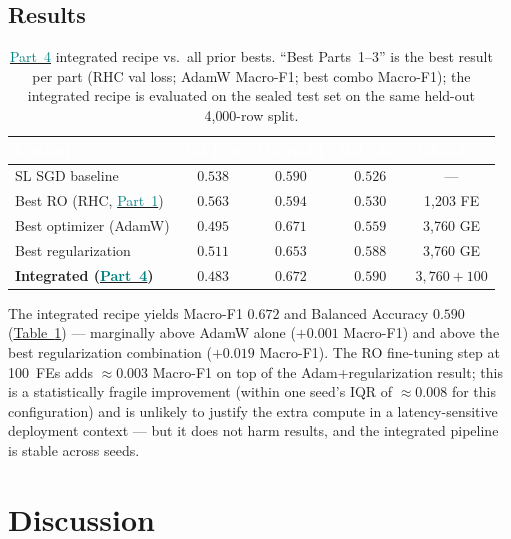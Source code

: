 \documentclass[conference]{IEEEtran}
\newcommand{\tabref}[1]{\hyperref[#1]{\textcolor{sage}{Table~\ref*{#1}}}}
\newcommand{\partref}[2]{\hyperref[#2]{\textcolor{teal}{Part~#1}}}
\begin{document}
\subsection{Results}\label{sec:p4:results}

\begin{table}[t]\centering
\caption{\partref{4}{sec:p4} integrated recipe vs.\ all prior bests.
``Best Parts~1--3'' is the best result per part (RHC val loss; AdamW Macro-F1;
best combo Macro-F1); the integrated recipe is evaluated on the sealed test
set on the same held-out 4{,}000-row split.}
\label{tab:p4}
\centering\small
{}
\begin{tabularx}{\linewidth}{Xcccc}
\toprule
\rowcolor{denimdark}
\textcolor{white}{\textbf{Method}} &
\textcolor{white}{\textbf{Val Loss}} & \textcolor{white}{\textbf{Macro-F1}} & \textcolor{white}{\textbf{Bal.\ Acc}} & \textcolor{white}{\textbf{GEs+FEs}} \\
\midrule
SL SGD baseline       & $0.538$ & $0.590$ & $0.526$ & --- \\
Best RO (RHC, \partref{1}{sec:p1}) & $0.563$ & $0.594$ & $0.530$ & 1{,}203 FE \\
Best optimizer (AdamW) & $0.495$ & $0.671$ & $0.559$ & 3{,}760 GE \\
Best regularization    & $0.511$ & $0.653$ & $0.588$ & 3{,}760 GE \\
\textbf{Integrated (\partref{4}{sec:p4})} & $\mathbf{0.483}$ & $\mathbf{0.672}$ &
$\mathbf{0.590}$ & $3{,}760{+}100$ \\
\bottomrule
\end{tabularx}
\end{table}

The integrated recipe yields Macro-F1 $0.672$ and Balanced Accuracy $0.590$
(\tabref{tab:p4}) --- marginally above AdamW alone ($+0.001$ Macro-F1) and
above the best regularization combination ($+0.019$ Macro-F1).
The RO fine-tuning step at 100~FEs adds ${\approx}0.003$ Macro-F1 on top of
the Adam+regularization result; this is a statistically fragile improvement
(within one seed's IQR of $\approx 0.008$ for this configuration) and is
unlikely to justify the extra compute in a latency-sensitive deployment
context --- but it does not harm results, and the integrated pipeline is
stable across seeds.

\section{Discussion}\label{sec:discuss}
\end{document}
